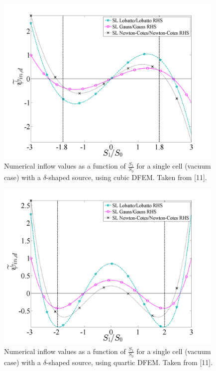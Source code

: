 \begin{figure}[!hbp]
\centering
\includegraphics[width=11cm]{chapter2_constant_xs/Final_Inflow_RHS_Comparison_Source_P3_MFP_0.png}
\caption{Numerical inflow values as a function of $\frac{S_1}{S_0}$ for a single cell (vacuum case) with a $\delta$-shaped source, using cubic DFEM.  Taken from [11].}
\label{fig:vac_inflow_p3}
\end{figure}
\begin{figure}[!htp]
\centering
\includegraphics[width=11cm]{chapter2_constant_xs/Final_Inflow_RHS_Comparison_Source_P4_MFP_0.png}
\caption{Numerical inflow values as a function of $\frac{S_1}{S_0}$ for a single cell (vacuum case) with a $\delta$-shaped source, using quartic DFEM.  Taken from [11].}
\label{fig:vac_inflow_p4}
\end{figure}

